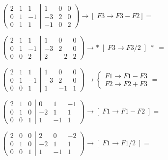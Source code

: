 \begin{proofw}
$\left( \begin{matrix} 2&1&1\\0&1&-1\\0&1&1   \end{matrix} \right|
\left. \begin{matrix} 1&0&0\\-3&2&0\\-1&0&2   \end{matrix} \right) \to [\; F3\to F3-F2]=$

$\left( \begin{matrix} 2&1&1\\0&1&-1\\0&0&2   \end{matrix} \right|
\left. \begin{matrix} 1&0&0\\-3&2&0\\2&-2&2   \end{matrix} \right) \to 
*\;[\;F3 \to F3/2\;]\;* \; =$

$\left( \begin{matrix} 2&1&1\\0&1&-1\\0&0&1   \end{matrix} \right|
\left. \begin{matrix} 1&0&0\\-3&2&0\\1&-1&1   \end{matrix} \right) \to 
\begin{cases} F1\to F1-F3 \\ F2 \to F2+F3    \end{cases} =$

$\left( \begin{matrix} 2&1&0\\0&1&0\\0&0&1   \end{matrix} \right|
\left. \begin{matrix} 0&1&-1\\-2&1&1\\1&-1&1   \end{matrix} \right) \to [\; F1 \to F1-F2\;] = $

$\left( \begin{matrix} 2&0&0\\0&1&0\\0&0&1   \end{matrix} \right|
\left. \begin{matrix} 2&0&-2\\-2&1&1\\1&-1&1   \end{matrix} \right) \to [\; F1 \to F1/2\; ]=$


\end{proofw}
